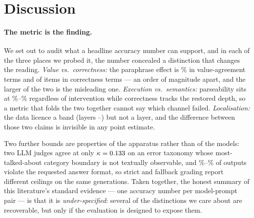 \section{Discussion}
\label{sec:discussion}

\paragraph{The metric is the finding.}
We set out to audit what a headline accuracy number can support, and in each of the
three places we probed it, the number concealed a distinction that changes the
reading. \emph{Value vs.\ correctness:} the paraphrase effect is
\pctChangedSevenBWording\% in value-agreement terms and \nbWordingFlips{} of
\nbWordingCovered{} items in correctness terms --- an order of magnitude apart, and
the larger of the two is the misleading one. \emph{Execution vs.\ semantics:}
parseability sits at \pctParseCorrupt\%--\pctParseMax\% regardless of intervention
while correctness tracks the restored depth, so a metric that folds the two together
cannot say which channel failed. \emph{Localisation:} the data licence a band
(layers \plateauLo--\plateauHi) but not a layer, and the difference between those two
claims is invisible in any point estimate.

Two further bounds are properties of the apparatus rather than of the models: two
LLM judges agree at only $\kappa=0.133$ on an error taxonomy whose
most-talked-about category boundary is not textually observable, and
\pctNoAnswerCot\%--\pctNoAnswerStruct\% of outputs violate the requested answer
format, so strict and fallback grading report different ceilings on the same
generations. Taken together, the honest summary of this literature's standard
evidence --- one accuracy number per model-prompt pair --- is that it is
\emph{under-specified}: several of the distinctions we care about are recoverable,
but only if the evaluation is designed to expose them.

